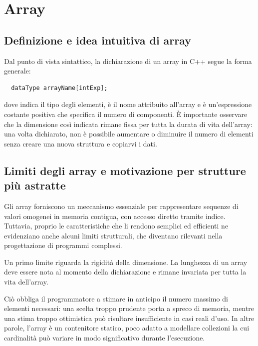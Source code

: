 \intro{}


\section{Array}
\subsection{Definizione e idea intuitiva di array}
Dal punto di vista sintattico, la dichiarazione di un array in C++ segue la forma generale:
\begin{codebox}
\begin{lstlisting}
  dataType arrayName[intExp];
\end{lstlisting}
\end{codebox}

dove  indica il tipo degli elementi,  è il nome attribuito all’array e  è un'espressione costante positiva che specifica il numero di componenti. È importante osservare che la dimensione così indicata rimane fissa per tutta la durata di vita dell’array: una volta dichiarato, non è possibile aumentare o diminuire il numero di elementi senza creare una nuova struttura e copiarvi i dati.



\subsection{ Limiti degli array e motivazione per strutture più astratte}

Gli array forniscono un meccanismo essenziale per rappresentare sequenze di valori omogenei in memoria contigua, con accesso diretto tramite indice. Tuttavia, proprio le caratteristiche che li rendono semplici ed efficienti ne evidenziano anche alcuni limiti strutturali, che diventano rilevanti nella progettazione di programmi complessi.

Un primo limite riguarda la rigidità della dimensione. La lunghezza di un array deve essere nota al momento della dichiarazione e rimane invariata per tutta la vita dell'array.

Ciò obbliga il programmatore a stimare in anticipo il numero massimo di elementi necessari: una scelta troppo prudente porta a spreco di memoria, mentre una stima troppo ottimistica può risultare insufficiente in casi reali d'uso. In altre parole, l’array è un contenitore statico, poco adatto a modellare collezioni la cui cardinalità può variare in modo significativo durante l'esecuzione.

